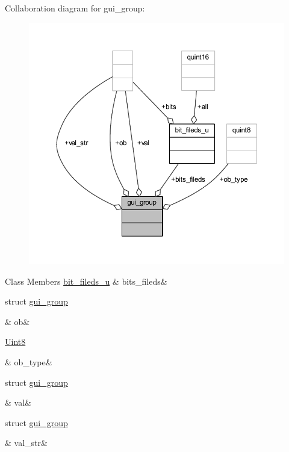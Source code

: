 Collaboration diagram for gui\+\_\+group\+:
\nopagebreak
\begin{figure}[H]
\begin{center}
\leavevmode
\includegraphics[width=350pt]{d6/db6/a00241}
\end{center}
\end{figure}
\begin{DoxyFields}{Class Members}
\hypertarget{a00001_a37d24c00aef216555f2459d32bbcb21b}{\hyperlink{a00001_d9/d2e/a00056}{bit\+\_\+fileds\+\_\+u}}\label{a00001_a37d24c00aef216555f2459d32bbcb21b}
&
bits\+\_\+fileds&
\\
\hline

\hypertarget{a00001_ae7df9815d67a8a669f037855d7ff1c5c}{struct \hyperlink{a00001_d1/d51/a00079}{gui\+\_\+group}}\label{a00001_ae7df9815d67a8a669f037855d7ff1c5c}
&
ob&
\\
\hline

\hypertarget{a00001_a3fd4fa69deb9b5e8697df532f7929160}{\hyperlink{a00001_a979e3e23b9a449e69ab6a8a83b6042f8}{Uint8}}\label{a00001_a3fd4fa69deb9b5e8697df532f7929160}
&
ob\+\_\+type&
\\
\hline

\hypertarget{a00001_a4520fef95576ed171c1a981868a12b9c}{struct \hyperlink{a00001_da/dec/a00080}{gui\+\_\+group}}\label{a00001_a4520fef95576ed171c1a981868a12b9c}
&
val&
\\
\hline

\hypertarget{a00001_ae977d5a6593fa8cbc6554450d7c3863f}{struct \hyperlink{a00001_d8/d53/a00081}{gui\+\_\+group}}\label{a00001_ae977d5a6593fa8cbc6554450d7c3863f}
&
val\+\_\+str&
\\
\hline

\end{DoxyFields}
\label{d0/de8/a00133}
\hypertarget{a00001_d0/de8/a00133}{}
